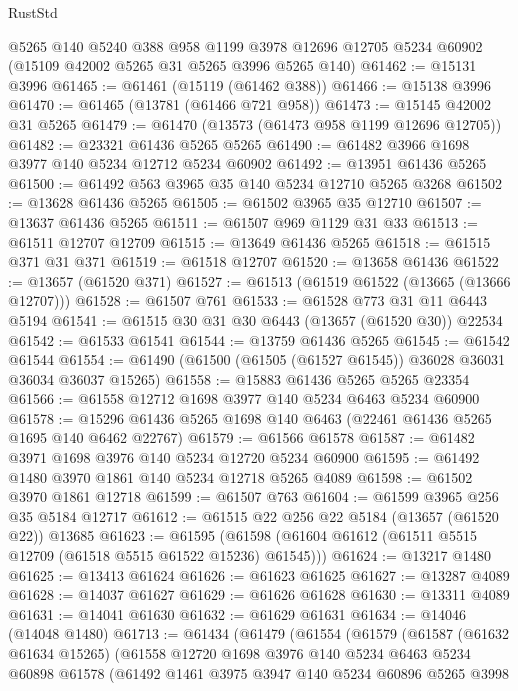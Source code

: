 \begin{lexlean}{RustStd}
\begin{coremodule}
    @5265
    @140
    @5240
    @388
    @958
    @1199
    @3978
    @12696
    @12705
    @5234
    @60902
    (@15109 @42002 @5265 @31 @5265 @3996 @5265 @140)
@61462 := @15131 @3996
@61465 := @61461 (@15119 (@61462 @388))
@61466 := @15138 @3996
@61470 := @61465 (@13781 (@61466 @721 @958))
@61473 := @15145 @42002 @31 @5265
@61479 := @61470 (@13573 (@61473 @958 @1199 @12696 @12705))
@61482 := @23321 @61436 @5265 @5265
@61490 := @61482 @3966 @1698 @3977 @140 @5234 @12712 @5234 @60902
@61492 := @13951 @61436 @5265
@61500 := @61492 @563 @3965 @35 @140 @5234 @12710 @5265 @3268
@61502 := @13628 @61436 @5265
@61505 := @61502 @3965 @35 @12710
@61507 := @13637 @61436 @5265
@61511 := @61507 @969 @1129 @31 @33
@61513 := @61511 @12707 @12709
@61515 := @13649 @61436 @5265
@61518 := @61515 @371 @31 @371
@61519 := @61518 @12707
@61520 := @13658 @61436
@61522 := @13657 (@61520 @371)
@61527 := @61513 (@61519 @61522 (@13665 (@13666 @12707)))
@61528 := @61507 @761
@61533 := @61528 @773 @31 @11 @6443 @5194
@61541 := @61515 @30 @31 @30 @6443 (@13657 (@61520 @30)) @22534
@61542 := @61533 @61541
@61544 := @13759 @61436 @5265
@61545 := @61542 @61544
@61554 := @61490 (@61500 (@61505 (@61527 @61545)) @36028 @36031 @36034 @36037 @15265)
@61558 := @15883 @61436 @5265 @5265 @23354
@61566 := @61558 @12712 @1698 @3977 @140 @5234 @6463 @5234 @60900
@61578 := @15296 @61436 @5265 @1698 @140 @6463 (@22461 @61436 @5265 @1695 @140 @6462 @22767)
@61579 := @61566 @61578
@61587 := @61482 @3971 @1698 @3976 @140 @5234 @12720 @5234 @60900
@61595 := @61492 @1480 @3970 @1861 @140 @5234 @12718 @5265 @4089
@61598 := @61502 @3970 @1861 @12718
@61599 := @61507 @763
@61604 := @61599 @3965 @256 @35 @5184 @12717
@61612 := @61515 @22 @256 @22 @5184 (@13657 (@61520 @22)) @13685
@61623 := @61595 (@61598 (@61604 @61612 (@61511 @5515 @12709 (@61518 @5515 @61522 @15236) @61545)))
@61624 := @13217 @1480
@61625 := @13413 @61624
@61626 := @61623 @61625
@61627 := @13287 @4089
@61628 := @14037 @61627
@61629 := @61626 @61628
@61630 := @13311 @4089
@61631 := @14041 @61630
@61632 := @61629 @61631
@61634 := @14046 (@14048 @1480)
@61713 := @61434
    (@61479
      (@61554
        (@61579
          (@61587
            (@61632 @61634 @15265)
            (@61558
              @12720
              @1698
              @3976
              @140
              @5234
              @6463
              @5234
              @60898
              @61578
              (@61492
                @1461
                @3975
                @3947
                @140
                @5234
                @60896
                @5265
                @3998

\end{coremodule}
\end{lexlean}
